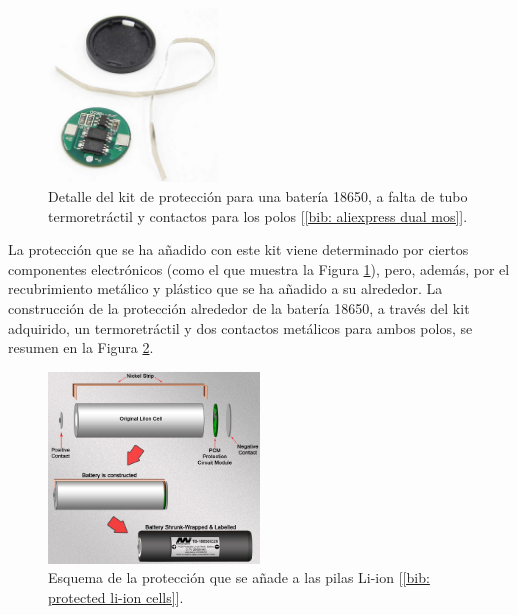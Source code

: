 \documentclass[12pt]{article}
\begin{document}
	\pagebreak
	
	\begin{figure}[h!]
		\begin{center}
			\includegraphics[width=0.4\textwidth]{img/proteccion_18650.png}
			\caption{Detalle del kit de protección para una batería 18650, a falta de tubo termoretráctil y contactos para los polos [\ref{bib: aliexpress dual mos}].}
			\label{Proteccion kit Li-Ion}
		\end{center}
	\end{figure}
	
	\noindent La protección que se ha añadido con este kit viene determinado por ciertos componentes electrónicos (como el que muestra la Figura \ref{Proteccion kit Li-Ion}), pero, además, por el recubrimiento metálico y plástico que se ha añadido a su alrededor. La construcción de la protección alrededor de la batería 18650, a través del kit adquirido, un termoretráctil y dos contactos metálicos para ambos polos, se resumen en la Figura \ref{Proteccion Li-Ion}. \\
	
	\begin{figure}[h!]
		\begin{center}
			\includegraphics[width=0.5\textwidth]{img/construction_prot_circuit.png}
			\caption{Esquema de la protección que se añade a las pilas Li-ion [\ref{bib: protected li-ion cells}].}
			\label{Proteccion Li-Ion}
		\end{center}
	\end{figure}
	
\end{document}
